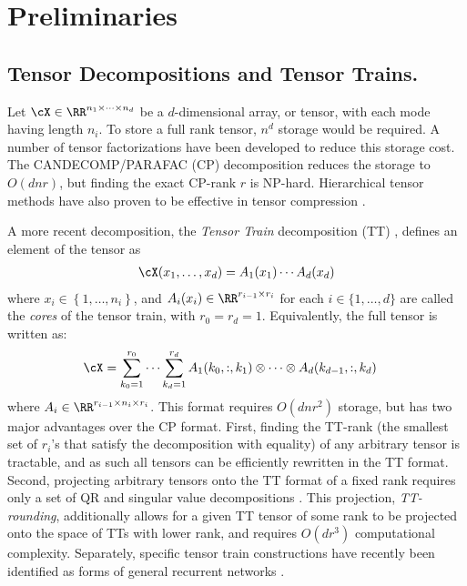 \section{Preliminaries}\label{sec:prelim}
\subsection{Tensor Decompositions and Tensor Trains. }
Let $\cX \in \RR^{n_1 \times \cdots \times n_d}$ be a $d$-dimensional array, or tensor, with each mode having length $n_i$. To store a full rank tensor, $n^d$ storage would be required. A number of tensor factorizations have been developed to reduce this storage cost. The CANDECOMP/PARAFAC (CP) \cite{harshman1970foundations,carroll1970analysis} decomposition reduces the storage to $O(dnr)$, but finding the exact CP-rank $r$ is NP-hard. Hierarchical tensor methods have also proven to be effective in tensor compression \cite{cohen2016expressive, cohen2016convolutional}.

A more recent decomposition, the \textit{Tensor Train} decomposition (TT) \cite{oseledets2011tensor}, defines an element of the tensor as
\begin{align}
\cX(x_1,\ldots,x_d) = A_1(x_1)\cdots A_d(x_d)
\end{align}
where $x_i \in \left\{1,\ldots, n_i\right\}$, and $A_i(x_i) \in \RR^{r_{i-1} \times r_{i}}$ for each $i \in \{1,\ldots,d\}$ are called the \textit{cores} of the tensor train, with $r_0 = r_d = 1$. Equivalently, the full tensor is written as:
\begin{align}\label{eq:fullTT}
    \cX &= \sum_{k_0 = 1}^{r_0} \cdots \sum_{k_d = 1}^{r_d} A_1(k_0,:,k_1) \otimes \cdots \otimes A_d(k_{d-1},:,k_d) 
\end{align}
where $A_i \in \RR^{r_{i-1}\times n_i \times r_i} $. This format requires $O(dnr^2)$ storage, but has two major advantages over the CP format. First, finding the TT-rank (the smallest set of $r_i$'s that satisfy the decomposition with equality) of any arbitrary tensor is tractable, and as such all tensors can be efficiently rewritten in the TT format. Second, projecting arbitrary tensors onto the TT format of a fixed rank requires only a set of QR and singular value decompositions \cite{oseledets2011tensor}. This projection, \textit{TT-rounding}, additionally allows for a given TT tensor of some rank to be projected onto the space of TTs with lower rank, and requires $O(dr^3)$ computational complexity. Separately, specific tensor train constructions have recently been identified as forms of general recurrent networks \cite{khrulkov2018generalized}.

